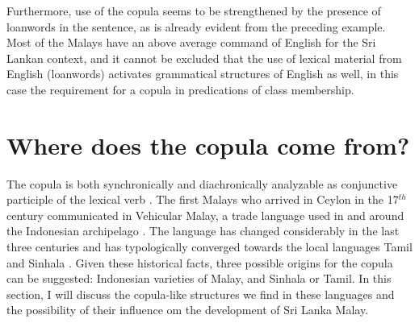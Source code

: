 \documentclass[a4paper,12pt]{article}
\begin{document}



Furthermore, use of the copula seems to be strengthened by the presence of loanwords in the sentence, as is already evident from the preceding example. Most of the Malays have an above average command of English for the Sri Lankan context, and it cannot be excluded that the use of lexical material from English (loanwords) activates grammatical structures of English as well, in this case the requirement for a copula in predications of class membership.

\section{Where does the copula come from?}\label{sec:contactlgs}
The copula is both synchronically and diachronically analyzable as conjunctive participle of the lexical verb . The first Malays who arrived in Ceylon in the 17$^{th}$ century communicated in Vehicular Malay, a trade language used in and around the Indonesian archipelago \citep{Smith2003timing, SmithEtAl2004}. The language has changed considerably in the last three centuries and has typologically converged towards the local languages Tamil and Sinhala \citep{SmithEtAl2004, SmithEtAl2006cll, Ansaldo2005ms, Ansaldo2008genesis,Nordhoff2009phd}. Given these historical facts, three possible origins for the copula can be suggested: Indonesian varieties of Malay, and Sinhala or Tamil. In this section, I will discuss the copula-like structures we find in these languages and the possibility of their influence om the development of Sri Lanka Malay.
\end{document}
